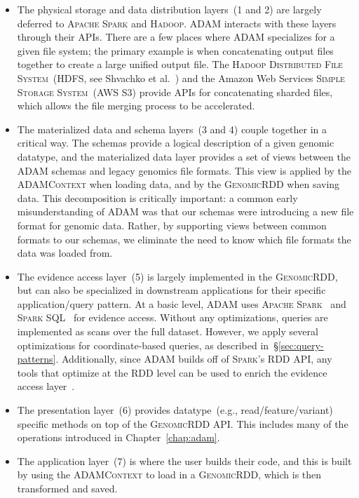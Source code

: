 \documentclass[phd]{ucbthesis}
\begin{document}
\begin{itemize}
\item The physical storage and data distribution layers~(1 and 2) are largely
  deferred to \textsc{Apache Spark} and \textsc{Hadoop}. \textsc{ADAM} interacts
  with these layers through their APIs. There are a few places where
  \textsc{ADAM} specializes for a given file system; the primary example is when
  concatenating output files together to create a large unified output file. The
  \textsc{Hadoop Distributed File System}~(HDFS, see Shvachko et
  al.~\cite{shvachko10}) and the Amazon Web Services \textsc{Simple Storage
    System}~(AWS S3) provide APIs for concatenating sharded files, which allows
  the file merging process to be accelerated.
\item The materialized data and schema layers~(3 and 4) couple together in a
  critical way. The schemas provide a logical description of a given genomic
  datatype, and the materialized data layer provides a set of views between the
  \textsc{ADAM} schemas and legacy genomics file formats. This view is applied
  by the \textsc{ADAMContext} when loading data, and by the \textsc{GenomicRDD}
  when saving data. This decomposition is critically important: a common early
  misunderstanding of \textsc{ADAM} was that our schemas were introducing a new
  file format for genomic data. Rather, by supporting views between common
  formats to our schemas, we eliminate the need to know which file formats the
  data was loaded from.
\item The evidence access layer~(5) is largely implemented in the
  \textsc{GenomicRDD}, but can also be specialized in downstream applications
  for their specific application/query pattern. At a basic level, \textsc{ADAM}
  uses \textsc{Apache Spark}~\cite{zaharia12} and \textsc{Spark
    SQL}~\cite{armbrust15} for evidence access. Without any optimizations,
  queries are implemented as scans over the full dataset. However, we apply
  several optimizations for coordinate-based queries, as described
  in~\S\ref{sec:query-patterns}. Additionally, since \textsc{ADAM} builds off of
  \textsc{Spark}'s RDD API, any tools that optimize at the RDD level can be used
  to enrich the evidence access layer~\cite{tu16, morrow17}.
\item The presentation layer~(6) provides datatype~(e.g., read/feature/variant)
  specific methods on top of the \textsc{GenomicRDD} API. This includes
  many of the operations introduced in Chapter~\ref{chap:adam}.
\item The application layer~(7) is where the user builds their code, and this is
  built by using the \textsc{ADAMContext} to load in a \textsc{GenomicRDD},
  which is then transformed and saved.
\end{itemize}
\end{document}
